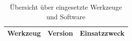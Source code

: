 \label{chap:hilfsmittelverzeichnis}

\begin{table}[htbp]
	\centering
	\caption{Übersicht über eingesetzte Werkzeuge und Software}
	\label{tab:werkzeuge}
	\begin{tabularx}{\textwidth}{@{}llX@{}}
		\toprule
		\textbf{Werkzeug} & \textbf{Version} & \textbf{Einsatzzweck} \\
		\midrule
		
		
		
		\bottomrule
	\end{tabularx}
\end{table}


